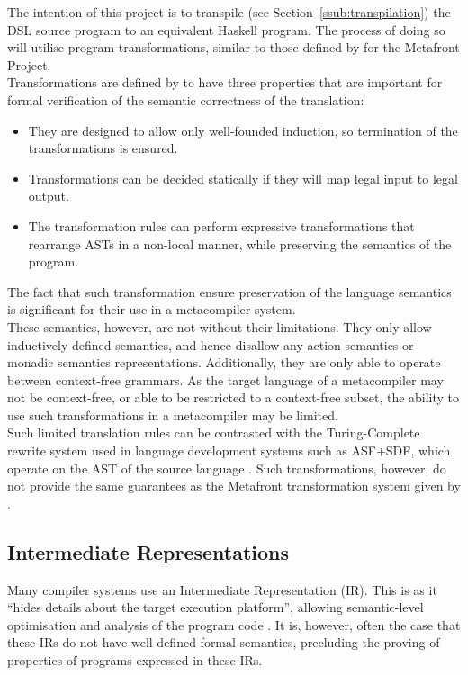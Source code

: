 The intention of this project is to transpile (see Section~\ref{ssub:transpilation}) the DSL source program to an equivalent Haskell program.
The process of doing so will utilise program transformations, similar to those defined by \citet{brabrand2003metafront} for the Metafront Project.\\

Transformations are defined by \citet{brabrand2003metafront} to have three properties that are important for formal verification of the semantic correctness of the translation:
\begin{itemize}
    \item They are designed to allow only well-founded induction, so termination of the transformations is ensured.
    \item Transformations can be decided statically if they will map legal input to legal output. 
    \item The transformation rules can perform expressive transformations that rearrange ASTs in a non-local manner, while preserving the semantics of the program.
\end{itemize}

The fact that such transformation ensure preservation of the language semantics is significant for their use in a metacompiler system. \\

These semantics, however, are not without their limitations. 
They only allow inductively defined semantics, and hence disallow any action-semantics or monadic semantics representations. 
Additionally, they are only able to operate between context-free grammars. 
As the target language of a metacompiler may not be context-free, or able to be restricted to a context-free subset, the ability to use such transformations in a metacompiler may be limited.\\

Such limited translation rules can be contrasted with the Turing-Complete rewrite system used in language development systems such as ASF+SDF, which operate on the AST of the source language \citep{van2001asf+}.
Such transformations, however, do not provide the same guarantees as the Metafront transformation system given by \citep{brabrand2003metafront}.


\subsection{Intermediate Representations} %
\label{sub:intermediate_representations}
Many compiler systems use an Intermediate Representation (IR).
This is as it ``hides details about the target execution platform'', allowing semantic-level optimisation and analysis of the program code \citep{Zhao:2012:FLI:2103621.2103709}.
It is, however, often the case that these IRs do not have well-defined formal semantics, precluding the proving of properties of programs expressed in these IRs. \\

